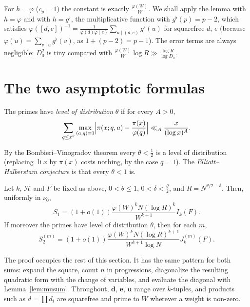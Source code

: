 For $h=\varphi$ ($c_p=1$) the constant is exactly $\frac{\varphi(W)}W$. We shall apply the lemma with $h=\varphi$ and with $h=g^\flat$, the multiplicative function with $g^\flat(p)=p-2$, which satisfies $\varphi([d,e])^{-1}=\frac1{\varphi(d)\varphi(e)}\sum_{u\mid(d,e)}g^\flat(u)$ for squarefree $d$, $e$ (because $\varphi(u)=\sum_{v\mid u}g^\flat(v)$, as $1+(p-2)=p-1$). The error terms are always negligible: $D_0^2$ is tiny compared with $\frac{\varphi(W)}W\log R\gg\frac{\log R}{\log D_0}$.

\section{The two asymptotic formulas}

\begin{definition}\label{def:level}
The primes have \emph{level of distribution} $\theta$ if for every $A>0$,
\[
\sum_{q\le x^\theta}\max_{(a,q)=1}\Bigl|\pi(x;q,a)-\frac{\pi(x)}{\varphi(q)}\Bigr|\ll_A\frac x{(\log x)^A}.
\]
\end{definition}

By the Bombieri--Vinogradov theorem every $\theta<\frac12$ is a level of distribution (replacing $\operatorname{li}x$ by $\pi(x)$ costs nothing, by the case $q=1$). The \emph{Elliott--Halberstam conjecture} is that every $\theta<1$ is.

\begin{theorem}[Maynard, 2013]\label{thm:maynardsums}
Let $k$, $\mathcal H$ and $F$ be fixed as above, $0<\theta\le1$, $0<\delta<\frac\theta2$, and $R=N^{\theta/2-\delta}$. Then, uniformly in $\nu_0$,
\[
S_1=(1+o(1))\frac{\varphi(W)^kN(\log R)^k}{W^{k+1}}I_k(F).
\]
If moreover the primes have level of distribution $\theta$, then for each $m$,
\[
S_2^{(m)}=(1+o(1))\frac{\varphi(W)^kN(\log R)^{k+1}}{W^{k+1}\log N}J_k^{(m)}(F).
\]
\end{theorem}

The proof occupies the rest of this section. It has the same pattern for both sums: expand the square, count $n$ in progressions, diagonalize the resulting quadratic form with the change of variables, and evaluate the diagonal with Lemma~\ref{lem:musum}. Throughout, $\mathbf d$, $\mathbf e$, $\mathbf u$ range over $k$-tuples, and products such as $d=\prod d_i$ are squarefree and prime to $W$ wherever a weight is non-zero.

